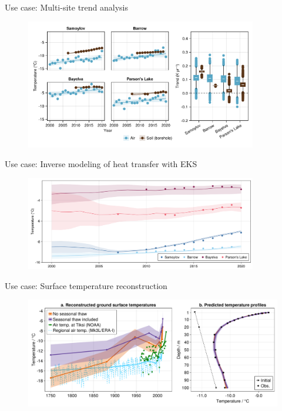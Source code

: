 \documentclass[12pt,aspectratio=169]{beamer}
\begin{document}
\begin{frame}{Use case: Multi-site trend analysis}

\begin{figure}
    \centering
    \includegraphics[width=0.9\textwidth]{figs/trend_comparison_ByBaSaPa.pdf}
\end{figure}

\end{frame}

\begin{frame}{Use case: Inverse modeling of heat transfer with EKS}

\begin{figure}
    \centering
    \includegraphics[width=0.9\textwidth]{figs/Ts_combined_obs_vs_model_cropped.png}
\end{figure}

\end{frame}

\begin{frame}{Use case: Surface temperature reconstruction}

\begin{figure}
    \centering
    \includegraphics[width=\textwidth]{figs/Tsurf_linear_vs_periodic_sardakh.pdf}
\end{figure}

\end{frame}
\end{document}
